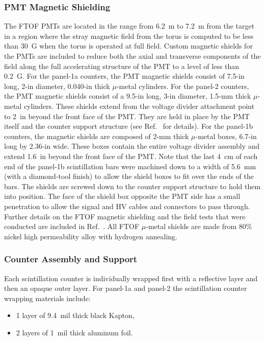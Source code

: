\documentclass[3p,times,twocolumn]{elsarticle}
\begin{document}
\subsubsection{PMT Magnetic Shielding}

The FTOF PMTs are located in the range from 6.2~m to 7.2~m from the target in a region where the
stray magnetic field from the torus is computed to be less than 30~G when the torus is operated at full
field. Custom magnetic shields for the PMTs are included to reduce both the axial and transverse
components of the field along the full accelerating structure of the PMT to a level of less than 0.2~G.
For the panel-1a counters, the PMT magnetic shields consist of 7.5-in long, 2-in diameter, 0.040-in thick
$\mu$-metal cylinders. For the panel-2 counters, the PMT magnetic shields consist of a 9.5-in long, 3-in
diameter, 1.5-mm thick $\mu$-metal cylinders. These shields extend from the voltage divider attachment
point to 2~in beyond the front face of the PMT. They are held in place by the PMT itself and the counter
support structure (see Ref.~\cite{tof-nim} for details).  For the panel-1b counters, the magnetic shields
are composed of 2-mm thick $\mu$-metal boxes, 6.7-in long by 2.36-in wide. These boxes contain the
entire voltage divider assembly and extend 1.6~in beyond the front face of the PMT. Note that the last
4~cm of each end of the panel-1b scintillation bars were machined down to a width of 5.6~mm (with a
diamond-tool finish) to allow the shield boxes to fit over the ends of the bars. The shields are screwed
down to the counter support structure to hold them into position. The face of the shield box opposite the
PMT side has a small penetration to allow the signal and HV cables and connectors to pass through. Further
details on the FTOF magnetic shielding and the field tests that were conducted are included in
Ref.~\cite{ftof-shields}. All FTOF $\mu$-metal shields are made from 80\% nickel high permeability alloy
with hydrogen annealing.

\subsubsection{Counter Assembly and Support}

Each scintillation counter is individually wrapped first with a reflective layer and then an opaque outer layer.
For panel-1a and panel-2 the scintillation counter wrapping materials include:

\begin{itemize}
\item 1 layer of 9.4~mil thick black Kapton,
\item 2 layers of 1~mil thick aluminum foil.
\end{itemize}
\end{document}
